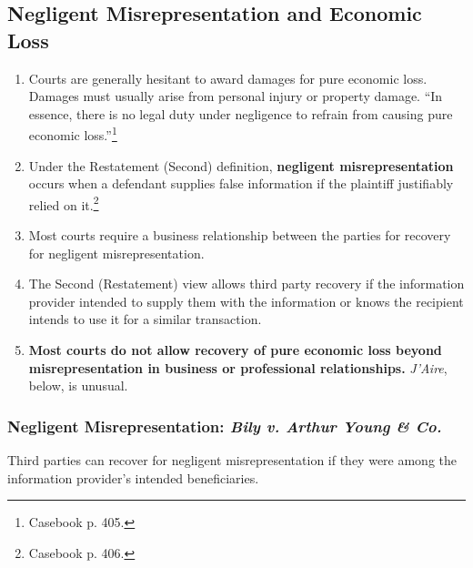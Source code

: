 \subsection{Negligent Misrepresentation and Economic Loss}

\begin{enumerate}
    \item Courts are generally hesitant to award damages for pure economic 
    loss. Damages must usually arise from personal injury or property damage. 
    ``In essence, there is no legal duty under negligence to refrain from 
    causing pure economic loss.''\footnote{Casebook p. 405.}
    \item Under the Restatement (Second) definition, \textbf{negligent 
    misrepresentation} occurs when a defendant supplies false information if 
    the plaintiff justifiably relied on it.\footnote{Casebook p. 406.}
    \item Most courts require a business relationship between the parties for 
    recovery for negligent misrepresentation.
    \item The Second (Restatement) view allows third party recovery if the 
    information provider intended to supply them with the information or knows 
    the recipient intends to use it for a similar transaction.
    \item \textbf{Most courts do not allow recovery of pure economic loss 
    beyond misrepresentation in business or professional relationships.} 
    \emph{J'Aire}, below, is unusual.
\end{enumerate}

\subsubsection{Negligent Misrepresentation: \emph{Bily v. Arthur Young \& 
Co.}}

Third parties can recover for negligent misrepresentation if they were among 
the information provider's intended beneficiaries.

